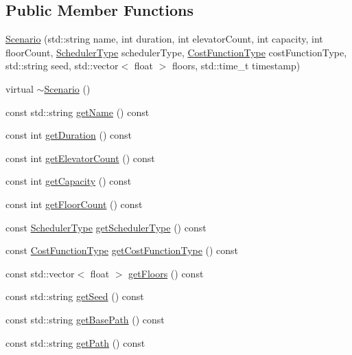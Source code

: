 \subsection*{Public Member Functions}
\begin{DoxyCompactItemize}
\item 
\hyperlink{class_scenario_a2ede6a692c79f88786dd28315ebcad5d}{Scenario} (std\+::string name, int duration, int elevator\+Count, int capacity, int floor\+Count, \hyperlink{_scheduler_type_8h_a38e49b4d2a59c90c891c884c009e9135}{Scheduler\+Type} scheduler\+Type, \hyperlink{_cost_function_type_8h_a7590c187782ef6d6bcba32749db5daa1}{Cost\+Function\+Type} cost\+Function\+Type, std\+::string seed, std\+::vector$<$ float $>$ floors, std\+::time\+\_\+t timestamp)
\item 
virtual \hyperlink{class_scenario_aa7e7548858cbc52614d46723c0333038}{$\sim$\+Scenario} ()
\item 
const std\+::string \hyperlink{class_scenario_a57ce787b9fe879c37f479b6658db0876}{get\+Name} () const 
\item 
const int \hyperlink{class_scenario_a117c99f5ad9cfc83406d54e14ecb8359}{get\+Duration} () const 
\item 
const int \hyperlink{class_scenario_a8479d2d429dc31564f73bb1d2935be29}{get\+Elevator\+Count} () const 
\item 
const int \hyperlink{class_scenario_af73b2c30106f7c4c6515b10ed048fa30}{get\+Capacity} () const 
\item 
const int \hyperlink{class_scenario_aa34a32b4a1c23891f7aa6f7a17b3594b}{get\+Floor\+Count} () const 
\item 
const \hyperlink{_scheduler_type_8h_a38e49b4d2a59c90c891c884c009e9135}{Scheduler\+Type} \hyperlink{class_scenario_a397fce5332d2a78ee3311abcddd1617a}{get\+Scheduler\+Type} () const 
\item 
const \hyperlink{_cost_function_type_8h_a7590c187782ef6d6bcba32749db5daa1}{Cost\+Function\+Type} \hyperlink{class_scenario_ae73d9b2ba0a5a02202a4cff22c6910d2}{get\+Cost\+Function\+Type} () const 
\item 
const std\+::vector$<$ float $>$ \hyperlink{class_scenario_af89b8c0a3fcb7f9d4290a09c99a68a8e}{get\+Floors} () const 
\item 
const std\+::string \hyperlink{class_scenario_aafd7c8f587cd5bd66cae341f4e1c4a39}{get\+Seed} () const 
\item 
const std\+::string \hyperlink{class_scenario_a34696f294405ce97dcb2e7174f2360e0}{get\+Base\+Path} () const 
\item 
const std\+::string \hyperlink{class_scenario_a4d82ef21d5fab6baa8848a79041c0074}{get\+Path} () const 
\end{DoxyCompactItemize}
